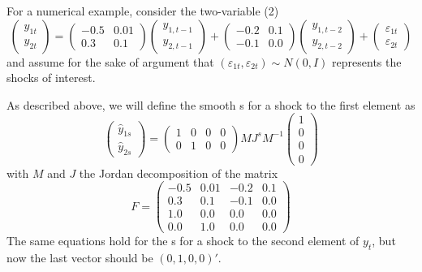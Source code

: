 \documentclass[12pt,fleqn]{article}
\newcommand{\vep}{\varepsilon}
\begin{document}
For a numerical example, consider the two-variable \VAR(2)
\begin{equation}\label{eq:2}
  \begin{pmatrix}
    y_{1t} \\ y_{2t}
  \end{pmatrix}
  =
  \begin{pmatrix}
    - 0.5 & 0.01 \\ 0.3 & 0.1
  \end{pmatrix}
  \begin{pmatrix}
    y_{1,t-1} \\ y_{2,t-1}
  \end{pmatrix}
  +
  \begin{pmatrix}
    -0.2 & 0.1 \\ -0.1 & 0.0
  \end{pmatrix}
  \begin{pmatrix}
    y_{1,t-2} \\ y_{2,t-2}
  \end{pmatrix}
  +
  \begin{pmatrix}
    \vep_{1t} \\ \vep_{2t}
  \end{pmatrix}
\end{equation}
and assume for the sake of argument that $(\vep_{1t},\vep_{2t}) \sim
N(0,I)$ represents the shocks of interest.

As described above, we will define the smooth \IRF s for a shock to
the first element as
\begin{equation*}
  \begin{pmatrix}
    \hat y_{1s} \\ \hat y_{2s}
  \end{pmatrix}
  =
  \begin{pmatrix}
    1 & 0 & 0 & 0 \\ 0 & 1 & 0 & 0
  \end{pmatrix}
  M J^s M^{-1}
  \begin{pmatrix}
    1 \\ 0 \\ 0 \\ 0
  \end{pmatrix}
\end{equation*}
with $M$ and $J$ the Jordan decomposition of the matrix
\begin{equation}
F = \begin{pmatrix}
    - 0.5 & 0.01 & -0.2 & 0.1 \\
      0.3 & 0.1 & -0.1 & 0.0 \\
      1.0 & 0.0 & 0.0 & 0.0 \\
      0.0 & 1.0 & 0.0 & 0.0
  \end{pmatrix}
\end{equation}
The same equations hold for the \IRF s for a shock to the second
element of $y_t$, but now the last vector should be $(0, 1, 0, 0)'$.
\end{document}
